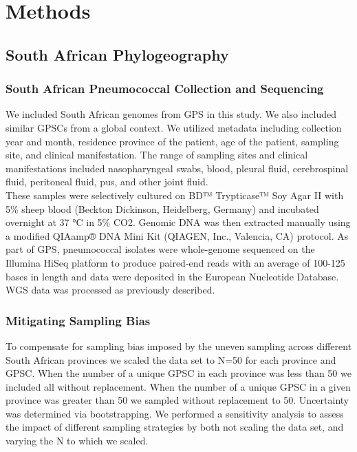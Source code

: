 \documentclass{article}
\begin{document}
\section{Methods}
\subsection{South African Phylogeography}
\subsubsection{South African Pneumococcal Collection and Sequencing}
We included South African genomes from GPS in this study. We also included similar GPSCs from a global context. We utilized metadata including collection year and month, residence province of the patient, age of the patient, sampling site, and clinical manifestation. The range of sampling sites and clinical manifestations  included nasopharyngeal swabs, blood, pleural fluid, cerebrospinal fluid, peritoneal fluid, pus, and other joint fluid. 
\\These samples were selectively cultured on BD™ Trypticase™ Soy Agar II with 5\% sheep blood (Beckton Dickinson, Heidelberg, Germany) and incubated overnight at 37 °C in 5\% CO2. Genomic DNA was then extracted manually using a modified QIAamp® DNA Mini Kit (QIAGEN, Inc., Valencia, CA) protocol. As part of GPS, pneumococcal isolates were whole-genome sequenced on the Illumina HiSeq platform to produce paired-end reads with an average of 100-125 bases in length and data were deposited in the European Nucleotide Database. WGS data was processed as previously described\cite{gladstoneInternationalGenomicDefinition2019b}.
\subsubsection{Mitigating Sampling Bias}
To compensate for sampling bias imposed by the uneven sampling across different South African provinces we scaled the data set to N=50 for each province and GPSC. When the number of a unique GPSC in each province was less than 50 we included all without replacement. When the number of a unique GPSC in a given province was greater than 50 we sampled without replacement to 50. Uncertainty was determined via bootstrapping. We performed a sensitivity analysis to assess the impact of different sampling strategies by both not scaling the data set, and varying the N to which we scaled. 
\end{document}
